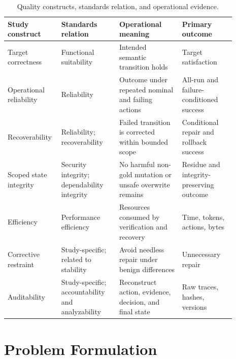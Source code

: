 \documentclass[pdflatex,sn-apa]{sn-jnl}
\begin{document}
\begin{table}[htbp]
\centering
\caption{Quality constructs, standards relation, and operational evidence.}
\label{tab:quality_model}
\scriptsize
\setlength{\tabcolsep}{2.8pt}
\begin{tabular}{>{\raggedright\arraybackslash}p{0.17\linewidth}>{\raggedright\arraybackslash}p{0.24\linewidth}>{\raggedright\arraybackslash}p{0.26\linewidth}>{\raggedright\arraybackslash}p{0.22\linewidth}}
\toprule
Study construct & Standards relation & Operational meaning & Primary outcome \\
\midrule
Target correctness & Functional suitability & Intended semantic transition holds & Target satisfaction \\
Operational reliability & Reliability & Outcome under repeated nominal and failing actions & All-run and failure-conditioned success \\
Recoverability & Reliability; recoverability & Failed transition is corrected within bounded scope & Conditional repair and rollback success \\
Scoped state integrity & Security integrity; dependability integrity & No harmful non-gold mutation or unsafe overwrite remains & Residue and integrity-preserving outcome \\
Efficiency & Performance efficiency & Resources consumed by verification and recovery & Time, tokens, actions, bytes \\
Corrective restraint & Study-specific; related to stability & Avoid needless repair under benign differences & Unnecessary repair \\
Auditability & Study-specific; accountability and analyzability & Reconstruct action, evidence, decision, and final state & Raw traces, hashes, versions \\
\bottomrule
\end{tabular}
\end{table}

\section{Problem Formulation}
\end{document}
